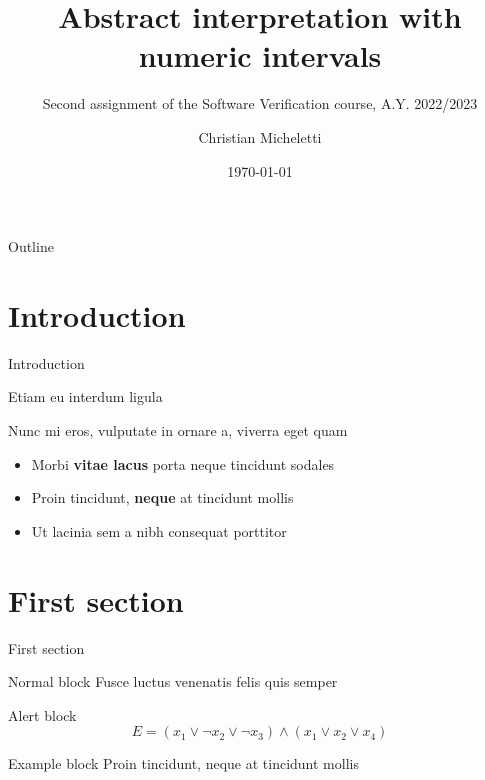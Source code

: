 \documentclass{beamer}
\title{Abstract interpretation with numeric intervals}
\subtitle{Second assignment of the Software Verification course, A.Y. 2022/2023}
\author{Christian Micheletti}
\date{\today}
\begin{document}
	\maketitle

	\begin{frame}{Outline}
		\tableofcontents
	\end{frame}

    


	\section{Introduction}

	\begin{frame}{Introduction}

		Etiam eu interdum ligula

		Nunc mi eros, vulputate in ornare a, viverra eget quam \vspace{.5em}

		\begin{itemize}
			\item Morbi \textbf{vitae lacus} porta neque tincidunt sodales \vspace{.5em}
			\item Proin tincidunt, \textbf{neque} at tincidunt mollis \vspace{.5em}
			\item Ut \alert{lacinia sem a nibh} consequat porttitor
		\end{itemize}
	\end{frame}


	\section{First section}

	\begin{frame}{First section}
		\begin{block}{Normal block}
			Fusce luctus venenatis felis quis semper
		\end{block}

		\begin{alertblock}{Alert block}
			$$ E = (x_1 \vee \neg x_2 \vee \neg x_3) \wedge (x_1 \vee x_2 \vee x_4) $$
		\end{alertblock}

		\begin{exampleblock}{Example block}
			Proin tincidunt, neque at tincidunt mollis
		\end{exampleblock}
	\end{frame}
\end{document}
